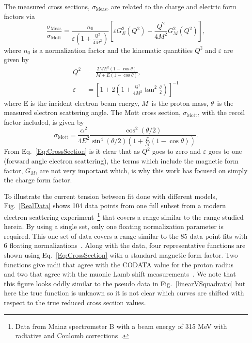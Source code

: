 \documentclass[10pt,aps,prc,twocolumn]{revtex4-1}
\begin{document}
The measured cross sections, $\sigma_{\mathrm{Meas}}$,  are related to the charge and electric form factors via 
\begin{equation}
\frac{\sigma_{\text{Meas}}}{\sigma_{\text{Mott}}} = \frac{n_0}{\varepsilon (1 + \frac{Q^2}{4M^2})} \left[\varepsilon G_E^2 (Q^2) + \frac{Q^2}{4M^2} G_M^2 (Q^2)\right],
\label{Eq:CrossSection}
\end{equation}
where $n_0$ is a normalization factor and the kinematic quantities $Q^2$ and $\varepsilon$ are given by
\begin{align}
Q^2 & = \frac{2M E^2 (1 - \cos{\theta})}{M + E (1 - \cos{\theta})}, \\
\varepsilon & = \left[1 + 2(1 + \frac{Q^2}{4M^2}  \tan^2{\frac{\theta}{2}})\right]^{-1}
\end{align}
where E is the incident electron beam energy, $M$~is the proton mass, $\theta$~is the measured electron scattering angle. 
The Mott cross section, $\sigma_{\text{Mott}}$, with the recoil factor included, is given by
\begin{equation}
\sigma_{\text{Mott}}  = \frac{\alpha^2}{4 E^2} \frac{\cos^2{(\theta / 2)}}{\sin^4{(\theta / 2)} ( 1 + \frac{E}{M} (1 - \cos{\theta}))}.
\end{equation}
From Eq.~\ref{Eq:CrossSection} is it clear that as $Q^2$ goes to zero and $\varepsilon$ goes to one (forward angle electron scattering), 
the terms which include the  magnetic form factor, $G_M$, are not very important which, is why this work has
focused on simply the charge form factor.

To illustrate the current tension between fit done with different models, Fig.~\ref{RealData} shows 
104 data points from one full subset from a modern electron scattering 
experiment~\footnote{Data from Mainz spectrometer B with a beam energy of 315 MeV with radiative and Coulomb corrections~\cite{Bernauer:2013tpr}.} 
that covers a range similar to the range studied herein.  By using a single set, only one floating normalization
parameter is required.
This one set of data covers a range similar to the 85 data point fits with 6 floating normalizations~\cite{Rosenfelder:1999cd,Hill:2010yb}.
Along with the data, four representative functions are shown using Eq.~\ref{Eq:CrossSection} with a standard magnetic form factor.
Two functions give radii that agree with the CODATA value for the proton
radius~\cite{Bernauer:2013tpr,Ye:2017gyb} and two that agree with the muonic Lamb shift measurements~\cite{Higinbotham:2015rja,Griffioen:2015hta}.
We note that this figure looks oddly similar to the pseudo data in Fig.~\ref{linearVSquadratic} but here the true function is unknown 
so it is not clear which curves are shifted with respect to the true reduced cross section values.
\end{document}
